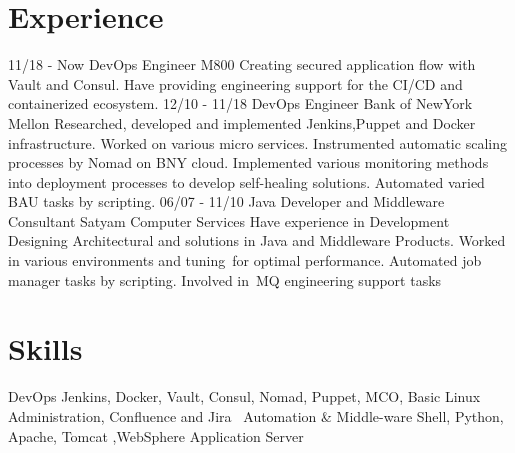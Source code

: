 \documentclass[]{friggeri-cv}
\begin{document}
\section{Experience}
\begin{entrylist}
  \entry
    {11/18 - Now}
    {DevOps Engineer}
    {M800}
    {Creating secured application flow with Vault and Consul. Have providing engineering support for the CI/CD and containerized ecosystem.}
  \entry
    {12/10 - 11/18}
    {DevOps Engineer}
    {Bank of NewYork Mellon}
    {Researched, developed and implemented Jenkins,Puppet and Docker infrastructure. Worked on various micro services. Instrumented automatic scaling processes by Nomad on BNY cloud. Implemented various monitoring methods into deployment processes to develop self-healing solutions. Automated varied BAU tasks by scripting. }
  \entry
    {06/07 - 11/10}
    {Java Developer and Middleware Consultant}
    {Satyam Computer Services}
    {Have experience in Development Designing Architectural and solutions in Java and Middleware Products. Worked in various environments and tuning for optimal performance. Automated job manager tasks by scripting. Involved in MQ engineering support tasks}
   
   
\end{entrylist}


\section{Skills}
\begin{entrylist}
 \entry
    { }
    {DevOps}
    {}
    {Jenkins, Docker, Vault, Consul, Nomad, Puppet, MCO, Basic Linux Administration, Confluence and  Jira }
 \entry
    { }
    {Automation \& Middle-ware}
    {}
    {Shell, Python, Apache, Tomcat ,WebSphere Application Server}

\end{entrylist}
\end{document}
